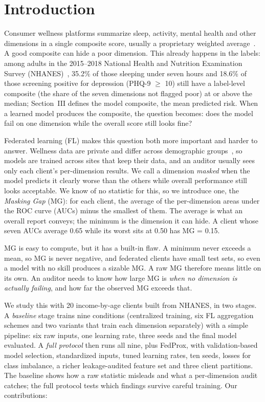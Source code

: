 \section{Introduction}

Consumer wellness platforms summarize sleep, activity, mental health and other dimensions in a single composite score, usually a proprietary weighted average~\cite{doherty2025,whoop2024,garmin2024,oura2024}. A good composite can hide a poor dimension. This already happens in the labels: among adults in the 2015--2018 National Health and Nutrition Examination Survey (NHANES)~\cite{nhanes2015}, 35.2\% of those sleeping under seven hours and 18.6\% of those screening positive for depression (PHQ-9 $\geq$ 10) still have a label-level composite (the share of the seven dimensions not flagged poor) at or above the median; Section~III defines the model composite, the mean predicted risk. When a learned model produces the composite, the question becomes: does the model fail on one dimension while the overall score still looks fine?

Federated learning (FL) makes this question both more important and harder to answer. Wellness data are private and differ across demographic groups~\cite{rieke2020}, so models are trained across sites that keep their data, and an auditor usually sees only each client's per-dimension results. We call a dimension \emph{masked} when the model predicts it clearly worse than the others while overall performance still looks acceptable. We know of no statistic for this, so we introduce one, the \emph{Masking Gap} (MG): for each client, the average of the per-dimension areas under the ROC curve (AUCs) minus the smallest of them. The average is what an overall report conveys; the minimum is the dimension it can hide. A client whose seven AUCs average 0.65 while its worst sits at 0.50 has MG = 0.15.

MG is easy to compute, but it has a built-in flaw. A minimum never exceeds a mean, so MG is never negative, and federated clients have small test sets, so even a model with no skill produces a sizable MG. A raw MG therefore means little on its own. An auditor needs to know how large MG is \emph{when no dimension is actually failing}, and how far the observed MG exceeds that.

We study this with 20 income-by-age clients built from NHANES, in two stages. A \emph{baseline} stage trains nine conditions (centralized training, six FL aggregation schemes and two variants that train each dimension separately) with a simple pipeline: six raw inputs, one learning rate, three seeds and the final model evaluated. A \emph{full protocol} then runs all nine, plus FedProx, with validation-based model selection, standardized inputs, tuned learning rates, ten seeds, losses for class imbalance, a richer leakage-audited feature set and three client partitions. The baseline shows how a raw statistic misleads and what a per-dimension audit catches; the full protocol tests which findings survive careful training. Our contributions:

